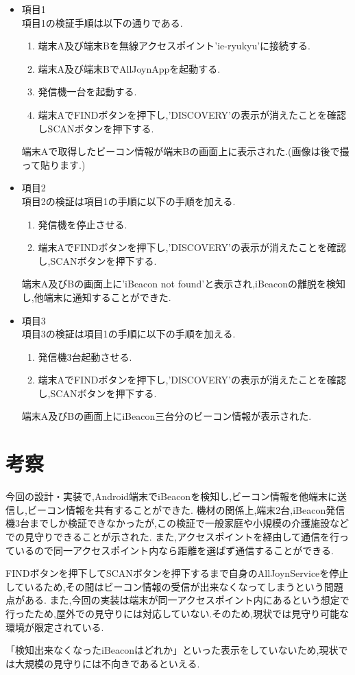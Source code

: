 \begin{itemize}
\item 項目1 \\
項目1の検証手順は以下の通りである.
\begin{enumerate}
\item 端末A及び端末Bを無線アクセスポイント'ie-ryukyu'に接続する.
\item 端末A及び端末BでAllJoynAppを起動する.
\item 発信機一台を起動する.
\item 端末AでFINDボタンを押下し,'DISCOVERY'の表示が消えたことを確認しSCANボタンを押下する.
\end{enumerate}

端末Aで取得したビーコン情報が端末Bの画面上に表示された.(画像は後で撮って貼ります.)


\item 項目2 \\
項目2の検証は項目1の手順に以下の手順を加える.
\begin{enumerate}
\item 発信機を停止させる.
\item 端末AでFINDボタンを押下し,'DISCOVERY'の表示が消えたことを確認し,SCANボタンを押下する.
\end{enumerate}

端末A及びBの画面上に'iBeacon not found'と表示され,iBeaconの離脱を検知し,他端末に通知することができた.

\item 項目3 \\
項目3の検証は項目1の手順に以下の手順を加える.
\begin{enumerate}
\item 発信機3台起動させる.
\item 端末AでFINDボタンを押下し,'DISCOVERY'の表示が消えたことを確認し,SCANボタンを押下する.
\end{enumerate}

端末A及びBの画面上にiBeacon三台分のビーコン情報が表示された.

\end{itemize}


\section{考察}
今回の設計・実装で,Android端末でiBeaconを検知し,ビーコン情報を他端末に送信し,ビーコン情報を共有することができた.
機材の関係上,端末2台,iBeacon発信機3台までしか検証できなかったが,この検証で一般家庭や小規模の介護施設などでの見守りできることが示された.
また,アクセスポイントを経由して通信を行っているので同一アクセスポイント内なら距離を選ばず通信することができる.

FINDボタンを押下してSCANボタンを押下するまで自身のAllJoynServiceを停止しているため,その間はビーコン情報の受信が出来なくなってしまうという問題点がある.
また,今回の実装は端末が同一アクセスポイント内にあるという想定で行ったため,屋外での見守りには対応していない.そのため,現状では見守り可能な環境が限定されている.

「検知出来なくなったiBeaconはどれか」といった表示をしていないため,現状では大規模の見守りには不向きであるといえる.
